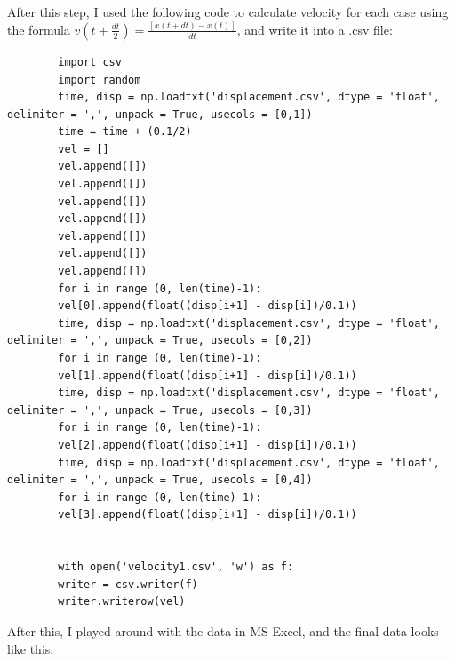 \documentclass{article}
\begin{document}
 	After this step, I used the following code to calculate velocity for each case using the formula $v(t+\frac{dt}{2}) = \frac{[x(t+dt) - x(t)]}{dt}$, and write it into a .csv file:
 	
 	\begin{lstlisting}
 		import csv
 		import random
 		time, disp = np.loadtxt('displacement.csv', dtype = 'float', delimiter = ',', unpack = True, usecols = [0,1])
 		time = time + (0.1/2)
 		vel = []
 		vel.append([])
 		vel.append([])
 		vel.append([])
 		vel.append([])
 		vel.append([])
 		vel.append([])
 		vel.append([])
 		for i in range (0, len(time)-1):
 		vel[0].append(float((disp[i+1] - disp[i])/0.1))
 		time, disp = np.loadtxt('displacement.csv', dtype = 'float', delimiter = ',', unpack = True, usecols = [0,2])
 		for i in range (0, len(time)-1):
 		vel[1].append(float((disp[i+1] - disp[i])/0.1))
 		time, disp = np.loadtxt('displacement.csv', dtype = 'float', delimiter = ',', unpack = True, usecols = [0,3])
 		for i in range (0, len(time)-1):
 		vel[2].append(float((disp[i+1] - disp[i])/0.1))
 		time, disp = np.loadtxt('displacement.csv', dtype = 'float', delimiter = ',', unpack = True, usecols = [0,4])
 		for i in range (0, len(time)-1):
 		vel[3].append(float((disp[i+1] - disp[i])/0.1))
 		
 		
 		with open('velocity1.csv', 'w') as f:
 		writer = csv.writer(f)
 		writer.writerow(vel)
 	\end{lstlisting}
 
 	After this, I played around with the data in MS-Excel, and the final data looks like this: 
 	
\end{document}
